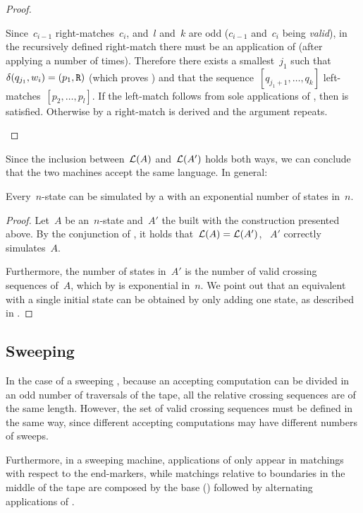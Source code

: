 \begin{proof}
\begin{description}
		      Since~$c_{i-1}$ right-matches~$c_i$, and~$l$ and~$k$ are odd ($c_{i-1}$ and~$c_i$ being \emph{valid}), in the recursively defined right-match there must be an application of  (after applying  a number of times).
		      Therefore there exists a smallest~$j_1$ such that~$\delta(q_{j_1},w_i)=(p_1,\mathtt R)$ (which proves ) and that the sequence~$[q_{j_1+1},\dots,q_k]$ left-matches~$[p_2,\dots,p_l]$.
		      If the left-match follows from sole applications of , then  is satisfied.
		      Otherwise by  a right-match is derived and the argument repeats. \qedhere
	\end{description}
\end{proof}

Since the inclusion between~$\mathcal L(A)$ and~$\mathcal L(A')$ holds both ways, we can conclude that the two machines accept the same language.
In general:
\begin{thrm}\label{thm:2DFAto1NFA}
	Every~$n$-state \TDFA can be simulated by a \ONFA with an exponential number of states in~$n$.
\end{thrm}
\begin{proof}
	Let~$A$ be an~$n$-state \TDFA and~$A'$ the \ONFA built with the construction presented above.
	By the conjunction of , it holds that~$\mathcal L(A)=\mathcal L(A')$, \ie~$A'$ correctly simulates~$A$.

	Furthermore, the number of states in~$A'$ is the number of valid crossing sequences of~$A$, which by  is exponential in~$n$.
	We point out that an equivalent \ONFA with a single initial state can be obtained by only adding one state, as described in .
\end{proof}


\subsection{Sweeping \texorpdfstring{\TDFAs}{2DFAs}}\label{sub:swep2DFA}
In the case of a sweeping \TDFA, because an accepting computation can be divided in an odd number of traversals of the tape, all the relative crossing sequences are of the same length.
However, the set of valid crossing sequences must be defined in the same way, since different accepting computations may have different numbers of sweeps.

Furthermore, in a sweeping machine, applications of  only appear in matchings with respect to the end-markers, while matchings relative to boundaries in the middle of the tape are composed by the base () followed by alternating applications of .



